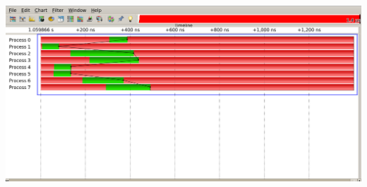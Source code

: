 \documentclass[fleqn]{article}
\begin{document}
\subsection{}%

\includegraphics[width=\textwidth]{vampir4}
\end{document}
